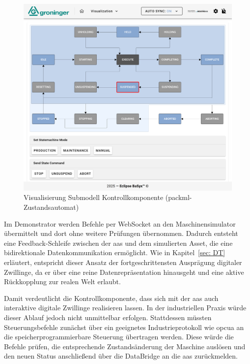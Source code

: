 \newpage
\begin{figure}[htbp]
    \centering 
    \includegraphics[width=1\textwidth]{Bilder/ErgebnisseAASWebUI/Kontrollkomponente.png} 
    \caption[Visualisierung Submodell Kontrollkomponente]{Visualisierung Submodell Kontrollkomponente (\acs{packml}-Zustandsautomat)} 
    \label{fig:PackMLZustandsautomat} 
\end{figure}
\vspace{-0.5em}


Im Demonstrator werden Befehle per WebSocket an den Maschinensimulator übermittelt und dort ohne weitere Prüfungen übernommen. 
Dadurch entsteht eine Feedback-Schleife zwischen der \acs{aas} und dem simulierten Asset, die eine bidirektionale Datenkommunikation ermöglicht. 
Wie in Kapitel~\ref{sec: DT} erläutert, entspricht dieser Ansatz der fortgeschrittensten Ausprägung digitaler Zwillinge, da er über eine reine Datenrepräsentation hinausgeht und eine aktive Rückkopplung zur realen Welt erlaubt. 

Damit verdeutlicht die Kontrollkomponente, dass sich mit der \acs{aas} auch interaktive digitale Zwillinge realisieren lassen. 
In der industriellen Praxis würde dieser Ablauf jedoch nicht unmittelbar erfolgen. 
Stattdessen müssten Steuerungsbefehle zunächst über ein geeignetes Industrieprotokoll wie \acs{opcua} an die speicherprogrammierbare Steuerung übertragen werden. 
Diese würde die Befehle prüfen, die entsprechende Zustandsänderung der Maschine auslösen und den neuen Status anschließend über die DataBridge an die \acs{aas} zurückmelden.

